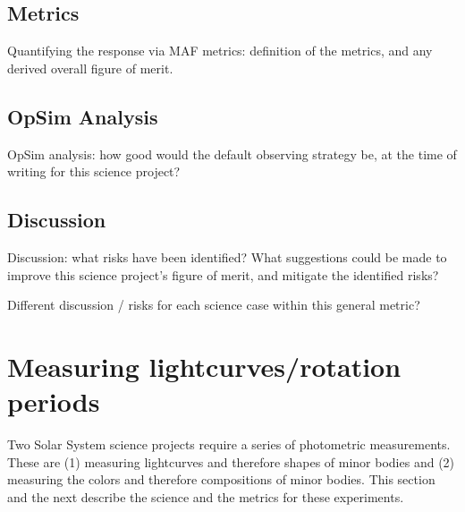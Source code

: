 
\subsection{Metrics}
\label{sec:\secname:metrics}

Quantifying the response via MAF metrics: definition of the metrics,
and any derived overall figure of merit.



\subsection{OpSim Analysis}
\label{sec:\secname:analysis}

OpSim analysis: how good would the default observing strategy be, at
the time of writing for this science project?



\subsection{Discussion}
\label{sec:\secname:discussion}

Discussion: what risks have been identified? What suggestions could be
made to improve this science project's figure of merit, and mitigate
the identified risks?

Different discussion / risks for each science case within this general metric?

\navigationbar


\section{Measuring lightcurves/rotation periods}
\def\secname{\chpname:lightcurves}\label{sec:\secname}

Two Solar System science projects require
a series of photometric measurements. These
are (1) measuring lightcurves and therefore
shapes of minor bodies and (2) measuring
the colors and therefore compositions of
minor bodies. This section and the next describe
the science and the metrics for these
experiments.


